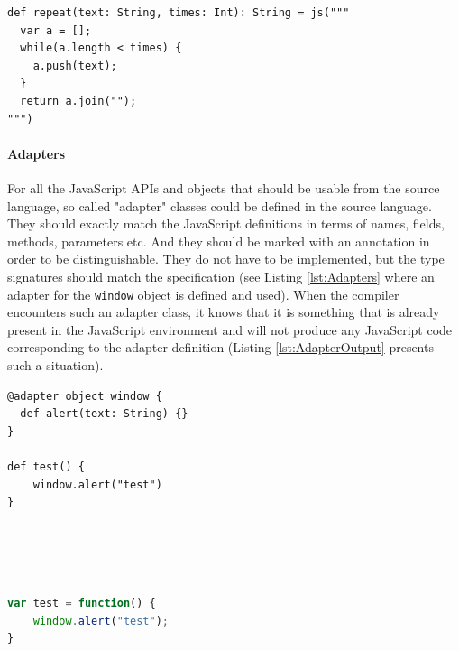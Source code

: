 \documentclass[12pt,a4paper]{report}
\begin{document}
\begin{minipage}{\linewidth}
\begin{lstlisting}[caption={Native code block example.},label={lst:NativeCodeBlock}]
def repeat(text: String, times: Int): String = js("""
  var a = [];
  while(a.length < times) {
    a.push(text);
  }
  return a.join("");
""")
\end{lstlisting}
\end{minipage}

\paragraph{Adapters} For all the JavaScript APIs and objects that should be usable from the source language, so called "adapter" classes could be defined in the source language. They should exactly match the JavaScript definitions in terms of names, fields, methods, parameters etc. And they should be marked with an annotation in order to be distinguishable. They do not have to be implemented, but the type signatures should match the specification (see  Listing \ref{lst:Adapters} where an adapter for the \texttt{window} object is defined and used). When the compiler encounters such an adapter class, it knows that it is something that is already present in the JavaScript environment and will not produce any JavaScript code corresponding to the adapter definition (Listing \ref{lst:AdapterOutput} presents such a situation).

\begin{center}
\begin{minipage}{.48\textwidth}
  \begin{lstlisting}[caption={Adapter definition and usage example.},label={lst:Adapters}]
@adapter object window {
  def alert(text: String) {}
}

def test() {
	window.alert("test")
}
  \end{lstlisting}
\end{minipage}
\hfill
\begin{minipage}{.48\textwidth}
  \begin{lstlisting}[language=JavaScript,caption={Adapter compilation output.},label={lst:AdapterOutput}]
	
	
	
	
var test = function() {
	window.alert("test");
}
  \end{lstlisting}
\end{minipage}
\end{center}
\end{document}
